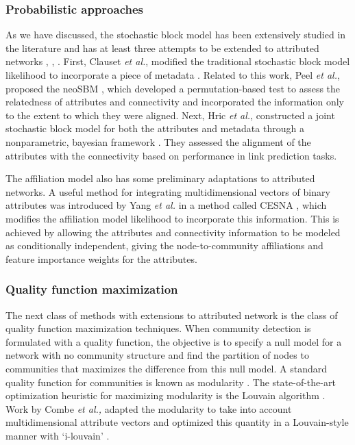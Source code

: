 \subsubsection{Probabilistic approaches}

As we have discussed, the stochastic block model has been extensively studied in the literature and has at least three attempts to be extended to attributed networks \cite{hric}, \cite{peel2017ground}, \cite{clauset}. First, Clauset \emph{et al.}, modified the traditional stochastic block model likelihood to incorporate a piece of metadata \cite{clauset}. Related to this work, Peel \emph{et al.}, proposed the neoSBM \cite{peel2017ground}, which developed a permutation-based test to assess the relatedness of attributes and connectivity and incorporated the information only to the extent to which they were aligned. Next, Hric \emph{et al.}, constructed a joint stochastic block model for both the attributes and metadata through a nonparametric, bayesian framework \cite{hric}. They assessed the alignment of the attributes with the connectivity based on performance in link prediction tasks. 

The affiliation model also has some preliminary adaptations to attributed networks. A useful method for integrating multidimensional vectors of binary attributes was introduced by Yang \emph{et al.} in a method called CESNA \cite{cesna}, which modifies the affiliation model likelihood to incorporate this information. This is achieved by allowing the attributes and connectivity information to be modeled as conditionally independent, giving the node-to-community affiliations and feature importance weights for the attributes.

\subsubsection{Quality function maximization}
The next class of methods with extensions to attributed network is the class of quality function maximization techniques. When community detection is formulated with a quality function, the objective is to specify a null model for a network with no community structure and find the partition of nodes to communities that maximizes the difference from this null model. A standard quality function for communities is known as modularity \cite{newmanmodularity}. The state-of-the-art optimization heuristic for maximizing modularity is the Louvain algorithm \cite{blondel}. Work by Combe \emph{et al.,} adapted the modularity to take into account multidimensional attribute vectors and optimized this quantity in a Louvain-style manner with `i-louvain' \cite{ilouvain}. 

